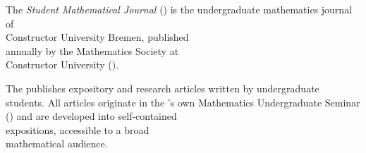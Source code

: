 \enlargethispage{5cm}
\thispagestyle{frontmatter}

\def\internal{0.3cm}
\def\external{0.3cm}

\begin{minipage}[t]{0.47\textwidth}


  \vspace{\internal}

  The \textit{Student Mathematical Journal} (\SMJ) is the
  undergraduate mathematics journal of\\ 
  Constructor University Bremen, published\\
  annually by the Mathematics Society at\\
  Constructor University (\MSCU).

  \vspace{\internal}

  The \SMJ publishes expository and research articles written by undergraduate students. All articles originate in the \MSCU's own Mathematics
  Undergraduate Seminar (\UgS) and are developed into self-contained\\
  expositions, accessible to a broad\\ mathematical audience.

  \vspace{\external}


  

  \vspace{\external}


  \vspace{\internal}

  

  \vspace{\external}


  \vspace{\internal}

  

\end{minipage}
